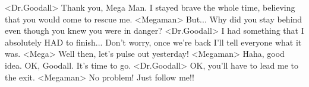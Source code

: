 <Dr.Goodall> Thank you, Mega Man. 
I stayed brave the whole time, believing that you would come to rescue me. 
<Megaman> But... Why did you stay behind even though you knew you were in danger? 
<Dr.Goodall> I had something that I absolutely HAD to finish... 
Don't worry, once we're back I'll tell everyone what it was. 
<Mega> Well then, let's pulse out yesterday! 
<Megaman> Haha, good idea. 
OK, Goodall. It's time to go. 
<Dr.Goodall> OK, you'll have to lead me to the exit. 
<Megaman> No problem! Just follow me!! 
